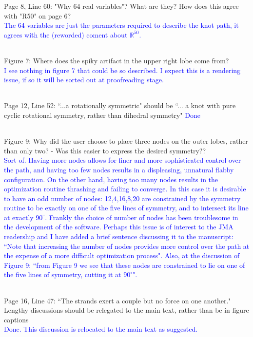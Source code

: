 \documentclass[12pt]{article}
\begin{document}
Page 8, Line 60: "Why 64 real variables"?  What are they?  How does
this agree with "R50" on page 6?\textcolor{blue}{\\ The 64 variables are just the parameters required to describe the knot path, it agrees with the (reworded) coment about $\mathbb{R}^{50}$.\\ \\}



Figure 7: Where does the spiky artifact in the upper right lobe come
from?  \textcolor{blue}{\\I see nothing in figure 7 that could be so
  described.  I expect this is a rendering issue, if so it will be
  sorted out at proofreading stage.\\ \\}


Page 12, Line 52: ``...a rotationally symmetric" should be ``... a knot with
pure cyclic rotational symmetry, rather than dihedral symmetry"
  \textcolor{blue}{Done\\ \\}


Figure 9: Why did the user choose to place three nodes on the outer
lobes, rather than only two? - Was this easier to express the desired
symmetry??  \textcolor{blue}{\\Sort of.  Having more nodes allows for
  finer and more sophisticated control over the path, and having too
  few nodes results in a displeasing, unnatural flabby configuration.
  On the other hand, having too many nodes results in the optimization
  routine thrashing and failing to converge.  In this case it is
  desirable to have an odd number of nodes: 12,4,16,8,20 are
  constrained by the symmetry routine to be exactly on one of the five
  lines of symmetry, and to intersect its line at exactly $90^\circ$.
  Frankly the choice of number of nodes has been troublesome in the
  development of the software.  Perhaps this issue is of interest to
  the JMA readership and I have added a brief sentence discussing it
  to the manuscript: ``Note that increasing the number of nodes
  provides more control over the path at the expense of a more
  difficult optimization process".  Also, at the discussion of Figure
  9: ``from Figure 9 we see that these nodes are constrained to lie on
  one of the five lines of symmetry, cutting it at $90^\circ$".\\ \\}

Page 16, Line 47: ``The strands exert a couple but no force on one
another."  Lengthy discussions should be relegated to the main text,
rather than be in figure captions \textcolor{blue}{\\Done.  This
  discussion is relocated to the main text as suggested.\\ \\}
\end{document}
